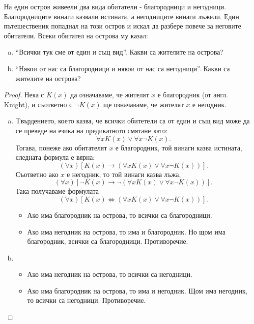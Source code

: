 \begin{problem}
  На един остров живеели два вида обитатели - благородници и негодници.
  Благородниците винаги казвали истината, а негодниците винаги лъжели.
  Един пътешественик попаднал на този остров и искал да разбере повече за
  неговите обитатели. 
  Всеки обитател на острова му казал:
  \begin{enumerate}[a)]
  \item
    ``Всички тук сме от един и същ вид''.
    Какви са жителите на острова?
  \item
    ``Някои от  нас са благородници и някои от нас са негодници''.
    Какви са жителите на острова?
  \end{enumerate}
\end{problem}
\begin{proof}
  Нека с $K(x)$ да означаваме, че жителят $x$ е благородник (от англ. Knight),
  и съответно с $\neg K(x)$ ще означаваме, че жителят $x$ е негодник.
  \begin{enumerate}[a)]
  \item 
    Tвърдението, което казва, че всички обитетели са от един и същ вид може да се преведе 
    на езика на предикатното смятане като:
    \[\forall x K(x) \vee \forall x \neg K(x).\]
    Тогава, понеже ако обитателят $x$ е благородник, той винаги казва истината, 
    следната формула е вярна:
    \[(\forall x)[K(x) \rightarrow (\forall x K(x) \vee \forall x \neg K(x))].\]
    Съответно ако $x$ е негодник, то той винаги казва лъжа, 
    \[(\forall x)[\neg K(x) \rightarrow \neg (\forall x K(x) \vee \forall x \neg K(x))].\]
    Така получаваме формулата
    \[(\forall x)[K(x) \iff (\forall x K(x) \vee \forall x \neg K(x))].\]
    \begin{itemize}
    \item 
      Ако има благородник на острова, то всички са благородници.
    \item
      Ако има негодник на острова, то има и благородник.
      Но щом има благородник, всички са благородници. Противоречие.
    \end{itemize}
  \item
    \begin{itemize}
    \item
      Ако има негодник на острова, то всички са негодници.
    \item
      Ако има благородник на острова, то има и негодник.
      Щом има негодник, то  всички са негодници. Противоречие.
    \end{itemize}
  \end{enumerate}
\end{proof}

